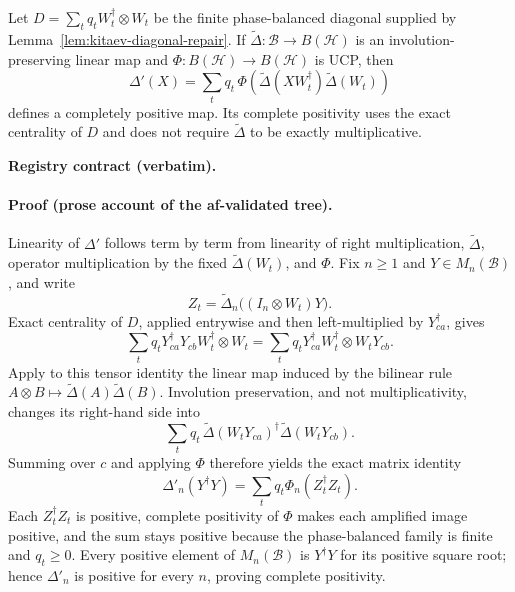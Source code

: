 \begin{corollary}\label{cor:kitaev-diagonal-cpization}
Let $D=\sum_tq_tW_t^{\dagger}\otimes W_t$ be the finite phase-balanced diagonal supplied
by Lemma~\ref{lem:kitaev-diagonal-repair}.  If
$\widetilde\Delta:\mathcal B\to B(\mathcal H)$ is an involution-preserving linear map and
$\Phi:B(\mathcal H)\to B(\mathcal H)$ is UCP, then
\[
  \Delta'(X)=\sum_tq_t\,
  \Phi\!\left(\widetilde\Delta(XW_t^{\dagger})\widetilde\Delta(W_t)\right)
\]
defines a completely positive map.  Its complete positivity uses the exact centrality of
$D$ and does not require $\widetilde\Delta$ to be exactly multiplicative.
\end{corollary}

\noindent\textbf{Registry contract (verbatim).}

\paragraph{Proof (prose account of the af-validated tree).}
Linearity of $\Delta'$ follows term by term from linearity of right multiplication,
$\widetilde\Delta$, operator multiplication by the fixed $\widetilde\Delta(W_t)$, and
$\Phi$.  Fix $n\ge1$ and $Y\in M_n(\mathcal B)$, and write
\[
  Z_t=\widetilde\Delta_n\bigl((I_n\otimes W_t)Y\bigr).
\]
Exact centrality of $D$, applied entrywise and then left-multiplied by $Y_{ca}^{\dagger}$,
gives
\[
 \sum_tq_tY_{ca}^{\dagger}Y_{cb}W_t^{\dagger}\otimes W_t
 =\sum_tq_tY_{ca}^{\dagger}W_t^{\dagger}\otimes W_tY_{cb}.
\]
Apply to this tensor identity the linear map induced by the bilinear rule
$A\otimes B\mapsto\widetilde\Delta(A)\widetilde\Delta(B)$.  Involution preservation,
and not multiplicativity, changes its right-hand side into
\[
  \sum_tq_t\,
  \widetilde\Delta(W_tY_{ca})^{\dagger}\widetilde\Delta(W_tY_{cb}).
\]
Summing over $c$ and applying $\Phi$ therefore yields the exact matrix identity
\[
  \Delta'_n(Y^{\dagger}Y)=\sum_tq_t\Phi_n(Z_t^{\dagger}Z_t).
\]
Each $Z_t^{\dagger}Z_t$ is positive, complete positivity of $\Phi$ makes each amplified
image positive, and the sum stays positive because the phase-balanced family is finite
and $q_t\ge0$.  Every positive element of $M_n(\mathcal B)$ is $Y^{\dagger}Y$ for its
positive square root; hence $\Delta'_n$ is positive for every $n$, proving complete
positivity.

